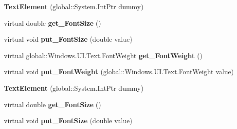 \begin{DoxyCompactItemize}
{\bfseries Text\+Element} (global\+::\+System.\+Int\+Ptr dummy)
\item 
\mbox{\label{class_windows_1_1_u_i_1_1_xaml_1_1_documents_1_1_text_element_a464e66349927c2d04603990a3ff81720}} 
virtual double {\bfseries get\+\_\+\+Font\+Size} ()
\item 
\mbox{\label{class_windows_1_1_u_i_1_1_xaml_1_1_documents_1_1_text_element_a95e88b90730bfefe38cd0f13d9f4555e}} 
virtual void {\bfseries put\+\_\+\+Font\+Size} (double value)
\item 
\mbox{\label{class_windows_1_1_u_i_1_1_xaml_1_1_documents_1_1_text_element_ac494f42bd84cb16612ea34a6a6e9a6f0}} 
virtual global\+::\+Windows.\+U\+I.\+Text.\+Font\+Weight {\bfseries get\+\_\+\+Font\+Weight} ()
\item 
\mbox{\label{class_windows_1_1_u_i_1_1_xaml_1_1_documents_1_1_text_element_ad99e56ff2f90ee72234321c2ba23b1e5}} 
virtual void {\bfseries put\+\_\+\+Font\+Weight} (global\+::\+Windows.\+U\+I.\+Text.\+Font\+Weight value)
\item 
\mbox{\label{class_windows_1_1_u_i_1_1_xaml_1_1_documents_1_1_text_element_a434a1629decb82d8f5a91fbca43cac71}} 
{\bfseries Text\+Element} (global\+::\+System.\+Int\+Ptr dummy)
\item 
\mbox{\label{class_windows_1_1_u_i_1_1_xaml_1_1_documents_1_1_text_element_a464e66349927c2d04603990a3ff81720}} 
virtual double {\bfseries get\+\_\+\+Font\+Size} ()
\item 
\mbox{\label{class_windows_1_1_u_i_1_1_xaml_1_1_documents_1_1_text_element_a95e88b90730bfefe38cd0f13d9f4555e}} 
virtual void {\bfseries put\+\_\+\+Font\+Size} (double value)
\item 
\mbox{\label{class_windows_1_1_u_i_1_1_xaml_1_1_documents_1_1_text_element_ac494f42bd84cb16612ea34a6a6e9a6f0}} 

\end{DoxyCompactItemize}
